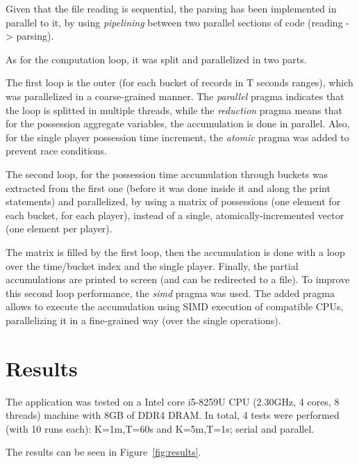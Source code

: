 \documentclass[a4paper, 10pt]{article}
\begin{document}
Given that the file reading is sequential, the parsing has been implemented in parallel to it, by using \emph{pipelining} between two parallel sections of code (reading -> parsing).

As for the computation loop, it was split and parallelized in two parts.

The first loop is the outer (for each bucket of records in T seconds ranges), which was parallelized in a coarse-grained manner.
The \emph{parallel} pragma indicates that the loop is splitted in multiple threads, while the \emph{reduction} pragma means that for the possession aggregate variables, the accumulation is done in parallel.
Also, for the single player possession time increment, the \emph{atomic} pragma was added to prevent race conditions.

The second loop, for the possession time accumulation through buckets was extracted from the first one (before it was done inside it and along the print statements) and parallelized, by using a matrix of possessions (one element for each bucket, for each player), instead of a single, atomically-incremented vector (one element per player).

The matrix is filled by the first loop, then the accumulation is done with a loop over the time/bucket index and the single player.
Finally, the partial accumulations are printed to screen (and can be redirected to a file).
To improve this second loop performance, the \emph{simd} pragma was used.
The added pragma allows to execute the accumulation using SIMD execution of compatible CPUs, parallelizing it in a fine-grained way (over the single operations).

\section*{Results}

The application was tested on a Intel core i5-8259U CPU (2.30GHz, 4 cores, 8 threads) machine with 8GB of DDR4 DRAM.
In total, 4 tests were performed (with 10 runs each): K=1m,T=60s and K=5m,T=1s; serial and parallel.

The results can be seen in Figure~\ref{fig:results}. 

\end{document}

